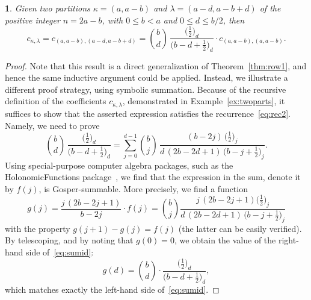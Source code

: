 \documentclass[smallextended]{svjour3}
\newtheorem{prop}[thm]{\protect\propositionname}
\providecommand{\propositionname}{Proposition}
\begin{document}
\begin{prop}\label{prop:p2row}
  Given two partitions $\kappa=(a,a-b)$ and $\lambda=(a-d,a-b+d)$ of the positive integer $n=2a-b$,
  with $0\leq b<a$ and $0\leq d\leq b/2$, then
  \begin{equation}\label{eq:2PartRec}
    c_{\kappa,\lambda} = c_{(a,a-b),(a-d,a-b+d)} =
    \binom{b}{d}\,\frac{\bigl(\frac12\bigr)_{\!d}}{\bigl(b-d+\frac12\bigr)_{\!d}} \cdot c_{(a,a-b),(a,a-b)}.
  \end{equation}
\end{prop}
\begin{proof}
  Note that this result is a direct generalization of Theorem~\ref{thm:row1},
  and hence the same inductive argument could be applied. Instead, we
  illustrate a different proof strategy, using symbolic summation. Because of
  the recursive definition of the coefficients $c_{\kappa,\lambda}$,
  demonstrated in Example~\ref{ex:twoparts}, it suffices to show that the
  asserted expression satisfies the recurrence~\eqref{eq:rec2}. Namely, we
  need to prove
  \begin{equation}\label{eq:sumid}
    \binom{b}{d}\,\frac{\bigl(\frac12\bigr)_{\!d}}{\bigl(b-d+\frac12\bigr)_{\!d}} =
    \sum_{j=0}^{d-1} \binom{b}{j}\,\frac{(b-2j)\,\bigl(\frac12\bigr)_{\!j}}{d\,(2b-2d+1)\,\bigl(b-j+\frac12\bigr)_{\!j}}.
  \end{equation}
  Using special-purpose computer algebra packages, such as the
  HolonomicFunctions package~\cite{HolonomicFunctions}, we find that the
  expression in the sum, denote it by $f(j)$, is Gosper-summable. More
  precisely, we find a function
  \[
    g(j) = \frac{j\,(2b-2j+1)}{b-2j} \cdot f(j) =
    \binom{b}{j}\frac{j\,(2b-2j+1) \bigl(\frac12\bigr)_{\!j}}{d\,(2b-2d+1)\,\bigl(b-j+\frac12\bigr)_{\!j}}
  \]
  with the property $g(j+1)-g(j)=f(j)$ (the latter can be easily
  verified). By telescoping, and by noting that $g(0)=0$, we obtain
  the value of the right-hand side of~\eqref{eq:sumid}:
  \[
    g(d) = \binom{b}{d}\cdot\frac{\bigl(\frac12\bigr)_{\!d}}{\bigl(b-d+\frac12\bigr)_{\!d}},
  \]
  which matches exactly the left-hand side of~\eqref{eq:sumid}. 
\end{proof}
\end{document}
